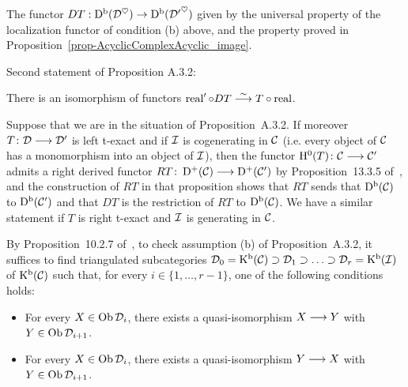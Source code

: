 \begin{definition}
\label{def-derived}
\leanok 
{}

The functor $DT:\operatorname{\mathrm{D}^b}(\mathcal{D}^\heartsuit)\to\operatorname{\mathrm{D}^b}({\mathcal{D}'}^\heartsuit)$ given by the universal property of the 
localization functor of condition (b) above, and the property proved in Proposition~\ref{prop-AcyclicComplexAcyclic_image}.

\end{definition}

Second statement of Proposition A.3.2:

\begin{definition}
\label{def-derived_comp}
\leanok 
{}

There is an isomorphism of functors $\operatorname{real}'\circ DT\stackrel{\sim}{\longrightarrow} T\circ\operatorname{real}$.

\end{definition}



\begin{remark}
Suppose that we are in the situation of Proposition~A.3.2.
If moreover $T\colon \mathcal{D}\longrightarrow\mathcal{D}'$ is left t-exact and if $\mathcal{I}$ is cogenerating in $\mathcal{C}$ (i.e. every object of $\mathcal{C}$ has a monomorphism into an object of $\mathcal{I}$), then the functor
$\mathrm{H}^0(T)\colon \mathcal{C}\longrightarrow\mathcal{C}'$ admits a right derived functor $RT\colon \operatorname{\mathrm{D}^+}(\mathcal{C})\longrightarrow\operatorname{\mathrm{D}^+}(\mathcal{C}')$ by Proposition~13.3.5 of~\cite{KS1}, and the construction of $RT$ in that proposition shows that
$RT$ sends that $\operatorname{\mathrm{D}^b}(\mathcal{C})$ to $\operatorname{\mathrm{D}^b}(\mathcal{C}')$ and that $DT$ is the restriction of $RT$ to $\operatorname{\mathrm{D}^b}(\mathcal{C})$. We have a similar statement if $T$ is right t-exact and $\mathcal{I}$ is generating in $\mathcal{C}$.

\label{rmk_der_fil1}
\end{remark}

\begin{remark}
By Proposition~10.2.7 of~\cite{KS1}, to check assumption (b) of Proposition~A.3.2, it suffices to find triangulated subcategories
$\mathcal{D}_0=\operatorname{\mathrm{K}^b}(\mathcal{C})\supset\mathcal{D}_1\supset\ldots\supset\mathcal{D}_r=\operatorname{\mathrm{K}^b}(\mathcal{I})$ of $\operatorname{\mathrm{K}^b}(\mathcal{C})$ such that, for every $i\in\{1,\ldots,r-1\}$, one of the following conditions holds:
\begin{itemize}
\item For every $X\in\operatorname{\mathrm{Ob}}\mathcal{D}_i$, there exists a quasi-isomorphism $X\longrightarrow Y$ with $Y\in\operatorname{\mathrm{Ob}}\mathcal{D}_{i+1}$.
\item For every $X\in\operatorname{\mathrm{Ob}}\mathcal{D}_i$, there exists a quasi-isomorphism $Y\longrightarrow X$ with $Y\in\operatorname{\mathrm{Ob}}\mathcal{D}_{i+1}$.

\end{itemize}

\label{rmk_der_fil2}
\end{remark}
